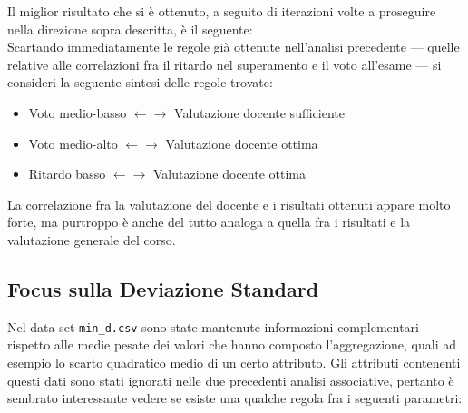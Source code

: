             Il miglior risultato che si è ottenuto, a seguito di iterazioni volte a proseguire nella direzione sopra descritta, è il seguente: \\

            


            Scartando immediatamente le regole già ottenute nell'analisi precedente --- quelle relative alle correlazioni fra il ritardo nel superamento e il voto all'esame --- si consideri la seguente sintesi delle regole trovate:

            \begin{itemize}
                \item Voto medio-basso $\leftarrow \rightarrow$ Valutazione docente sufficiente
                \item Voto medio-alto $\leftarrow \rightarrow$ Valutazione docente ottima
                \item Ritardo basso $\leftarrow \rightarrow$ Valutazione docente ottima
            \end{itemize}

            La correlazione fra la valutazione del docente e i risultati ottenuti appare molto forte, ma purtroppo è anche del tutto analoga a quella fra i risultati e la valutazione generale del corso.

        \subsection{Focus sulla Deviazione Standard}

        Nel data set \texttt{min\_d.csv} sono state mantenute informazioni complementari rispetto alle medie pesate dei valori che hanno composto l'aggregazione, quali ad esempio lo scarto quadratico medio di un certo attributo. Gli attributi contenenti questi dati sono stati ignorati nelle due precedenti analisi associative, pertanto è sembrato interessante vedere se esiste una qualche regola fra i seguenti parametri:

